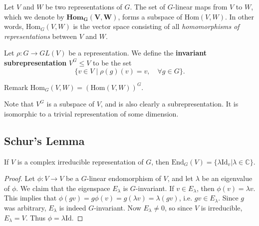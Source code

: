\begin{frame}
\begin{definition}		
Let $V$ and $W$ be two representations of $G$.  The set of $G$-linear maps from $V$ to $W$, which we denote by $\textbf{Hom}_\mathbf{G}\mathbf{(V,W)}$, forms a subspace of $\text{Hom}(V,W)$.  In other words, $\text{Hom}_{G}(V,W)$ is the vector space consisting of all \textit{homomorphisms of representations} between $V$ and $W$. 
\end{definition} 

\begin{definition}
Let $\rho \colon G \to GL(V)$ be a representation.  We define the \textbf{invariant subrepresentation} $V^G \leq V$ to be the set 
\[ \{ v \in V  \mid \rho(g)(v) = v,  \quad \forall g \in G \}. \]
\end{definition}

\begin{block}{Remark}
$\text{Hom}_G(V,W) = ( \text{Hom} (V,W) )^G $.
\end{block}
\end{frame}
\begin{note}
Note that $V^G$ is a subspace of $V$, and is also clearly a subrepresentation.   It is isomorphic to a trivial representation of some dimension.
\end{note}


\subsection{Schur's Lemma}
\begin{frame}
\begin{theorem} If $V$ is a complex irreducible representation of $G$, then $\text{End}_G(V) = \{ \lambda \text{Id}_v \vert \lambda \in \mathbb{C} \}$.
\end{theorem}
\begin{proof}
Let $\phi \colon V \to V$  be a $G$-linear endomorphism of $V$, and let $\lambda$ be an eigenvalue of $\phi$.  We claim that the eigenspace $E_\lambda$ is $G$-invariant. If $v \in E_\lambda$, then $\phi(v) = \lambda v$.  This implies that $\phi(g v) = g \phi(v) = g (\lambda v) = \lambda (gv)$, i.e. $gv \in E_\lambda$. Since $g$ was arbitrary, $E_\lambda$ is indeed $G$-invariant.  Now $E_\lambda \neq 0$, so since $V$ is irreducible, $E_\lambda = V$.  Thus $\phi = \lambda \text{Id}$.  
\end{proof}
\end{frame}

